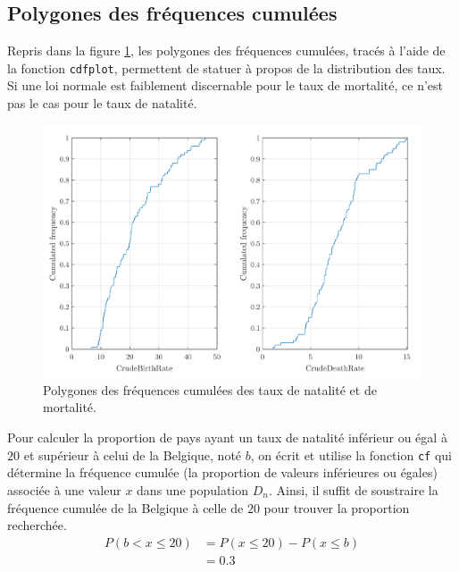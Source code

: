 \documentclass[a4paper, 12pt]{article}
\begin{document}
	\subsection{Polygones des fréquences cumulées} \label{sec:Q1e}
	Repris dans la figure \ref{figure:Q1e}, les polygones des fréquences cumulées, tracés à l'aide de la fonction \texttt{cdfplot}, permettent de statuer à propos de la distribution des taux. Si une loi normale est faiblement discernable pour le taux de mortalité, ce n'est pas le cas pour le taux de natalité. \par
	\begin{figure}[h]
		\centering
		\includegraphics[scale=0.24]{resources/pdf/q1e.pdf}
		\caption{Polygones des fréquences cumulées des taux de natalité et de mortalité.}
		\label{figure:Q1e}
	\end{figure}
    Pour calculer la proportion de pays ayant un taux de natalité inférieur ou égal à $20$ et supérieur à celui de la Belgique, noté $b$, on écrit et utilise la fonction \texttt{cf} qui détermine la fréquence cumulée (\cad la proportion de valeurs inférieures ou égales) associée à une valeur $x$ dans une population $D_{n}$. Ainsi, il suffit de soustraire la fréquence cumulée de la Belgique à celle de $20$ pour trouver la proportion recherchée.
    \begin{align*}
        P(b < x \leq 20) & = P(x \leq 20) - P(x \leq b) \\
                         & = \num{0.3}
    \end{align*}
\end{document}
